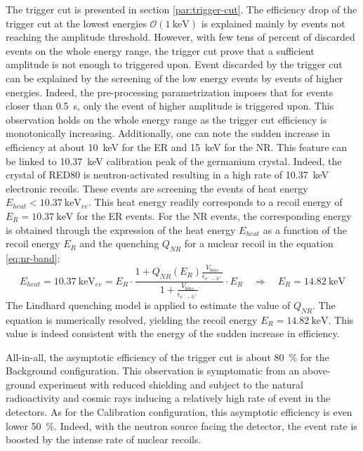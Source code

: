 The trigger cut is presented in section \ref{par:trigger-cut}. The efficiency drop of the trigger cut at the lowest energies $\mathcal{O}(\SI{1}{\kilo\eV})$ is explained mainly  by events not reaching the amplitude threshold. However, with few tens of percent of discarded events on the whole energy range, the trigger cut prove that a sufficient amplitude is not enough to triggered upon. Event discarded by the trigger cut can be explained by the screening of the low energy events by events of higher energies. Indeed, the pre-processing parametrization imposes that for events closer than \SI{0.5}{\s}, only the event of higher amplitude is triggered upon. This observation holds on the whole energy range as the trigger cut efficiency is monotonically increasing.
Additionally, one can note the sudden increase in efficiency at about \SI{10}{\kilo\eV} for the ER and \SI{15}{\kilo\eV} for the NR. This feature can be linked to \SI{10.37}{\kilo\eV} calibration peak of the germanium crystal. Indeed,  the crystal of RED80 is neutron-activated resulting in a high rate of \SI{10.37}{\kilo\eV} electronic recoils. These events are screening the events of heat energy $E_{heat} < \SI{10.37}{\kilo\eV}_{ee}$. This heat energy readily corresponds to a recoil energy of $E_R=\SI{10.37}{\kilo\eV}$ for the ER events. For the NR events, the corresponding energy is obtained through the expression of the heat energy $E_{heat}$ as a function of the recoil energy $E_R$ and the quenching $Q_{NR}$ for a nuclear recoil in the equation \ref{eq:nr-band}:
\begin{equation}
\label{eq:15kev-enigma}
E_{heat} = \SI{10.37}{\kilo\eV}_{ee} 
= 
E_R 
\cdot
\frac{
1 + Q_{NR} \left( E_R \right)\frac{V_{bias}}{\epsilon_{e^--h^+}}
}{
1 + \frac{V_{bias}}{\epsilon_{e^--h^+}}
} \cdot E_R
\quad \Rightarrow \quad
E_R = \SI{14.82}{\kilo\eV}
\end{equation}
The Lindhard quenching model is applied to estimate the value of $Q_{NR}$. The equation is numerically resolved, yielding the recoil energy $E_R = \SI{14.82}{\kilo\eV}$. This value is indeed consistent with the energy of the sudden increase in efficiency.

All-in-all, the asymptotic efficiency of the trigger cut is about \SI{80}{\percent} for the Background configuration. This observation is symptomatic from an above-ground experiment with reduced shielding and subject to the natural radioactivity and cosmic rays inducing a relatively high rate of event in the detectors. As for the Calibration configuration, this asymptotic efficiency is even lower \SI{50}{\percent}. Indeed, with the neutron source facing the detector, the event rate is boosted by the intense rate of nuclear recoils.

